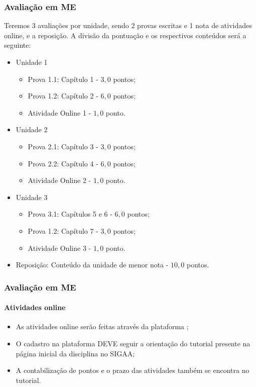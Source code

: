 \begin{frame}
	\frametitle{Avaliação em ME}

	Teremos 3 avaliações por unidade, sendo 2 provas escritas e 1 nota de atividades online, e a reposição. A divisão da pontuação e os respectivos conteúdos será a seguinte:
	\begin{itemize}
		\item Unidade 1
		\begin{itemize}
			\item Prova 1.1: Capítulo 1 - $3{,}0$ pontos;
			\item Prova 1.2: Capítulo 2 - $6{,}0$ pontos;
			\item Atividade Online 1 - $1{,}0$ ponto.
		\end{itemize} 
		\item Unidade 2
		\begin{itemize}
			\item Prova 2.1: Capítulo 3 - $3{,}0$ pontos;
			\item Prova 2.2: Capítulo 4 - $6{,}0$ pontos;
			\item Atividade Online 2 - $1{,}0$ ponto.
		\end{itemize}
		\item Unidade 3
		\begin{itemize}
			\item Prova 3.1: Capítulos 5 e 6 - $6{,}0$ pontos;
			\item Prova 1.2: Capítulo 7 - $3{,}0$ pontos;
			\item Atividade Online 3 - $1{,}0$ ponto.
		\end{itemize}
		\item Reposição: Conteúdo da unidade de menor nota - $10{,}0$ pontos.
	\end{itemize}
\end{frame}


\begin{frame}
	\frametitle{Avaliação em ME}
	\framesubtitle{Atividades online}

	\begin{itemize}
		\item As atividades online serão feitas através da plataforma ;
		\item O cadastro na plataforma DEVE seguir a orientação do tutorial presente na página inicial da disciplina no SIGAA;
		\item A contabilização de pontos e o prazo das atividades também se encontra no tutorial.
	\end{itemize}
		
\end{frame}
